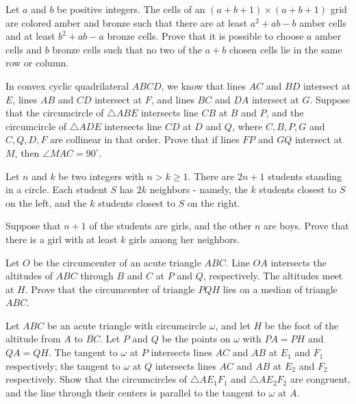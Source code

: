 \documentclass[11pt]{scrartcl}
\begin{document}
\begin{problem}[257453182523555]
Let $a$ and $b$ be positive integers. The cells of an $(a+b+1)\times (a+b+1)$ grid are colored amber and bronze such that there are at least $a^2+ab-b$ amber cells and at least $b^2+ab-a$ bronze cells. Prove that it is possible to choose $a$ amber cells and $b$ bronze cells such that no two of the $a+b$ chosen cells lie in the same row or column.
\end{problem}
\begin{problem}[6340105142765788083]
In convex cyclic quadrilateral $ABCD$, we know that lines $AC$ and $BD$ intersect at $E$, lines $AB$ and $CD$ intersect at $F$, and lines $BC$ and $DA$ intersect at $G$. Suppose that the circumcircle of $\triangle ABE$ intersects line $CB$ at $B$ and $P$, and the circumcircle of $\triangle ADE$ intersects line $CD$ at $D$ and $Q$, where $C,B,P,G$ and $C,Q,D,F$ are collinear in that order. Prove that if lines $FP$ and $GQ$ intersect at $M$, then $\angle MAC = 90^\circ$.
\end{problem}
\begin{problem}[3866807698726339637]
Let $n$ and $k$ be two integers with $n>k\geqslant 1$. There are $2n+1$ students standing in a circle. Each student $S$ has $2k$ neighbors - namely, the $k$ students closest to $S$ on the left, and the $k$ students closest to $S$ on the right.

Suppose that $n+1$ of the students are girls, and the other $n$ are boys. Prove that there is a girl with at least $k$ girls among her neighbors.
\end{problem}
\begin{problem}[2139114147569608698]
Let $O$ be the circumcenter of an acute triangle $ABC$. Line $OA$ intersects the altitudes of $ABC$ through $B$ and $C$ at $P$ and $Q$, respectively. The altitudes meet at $H$. Prove that the circumcenter of triangle $PQH$ lies on a median of triangle $ABC$.
\end{problem}
\begin{problem}[942176258255049]
Let $ABC$ be an acute triangle with circumcircle $\omega$, and let $H$ be the foot of the altitude from $A$ to $\overline{BC}$. Let $P$ and $Q$ be the points on $\omega$ with $PA = PH$ and $QA = QH$. The tangent to $\omega$ at $P$ intersects lines $AC$ and $AB$ at $E_1$ and $F_1$ respectively; the tangent to $\omega$ at $Q$ intersects lines $AC$ and $AB$ at $E_2$ and $F_2$ respectively. Show that the circumcircles of $\triangle AE_1F_1$ and $\triangle AE_2F_2$ are congruent, and the line through their centers is parallel to the tangent to $\omega$ at $A$.
\end{problem}
\end{document}

